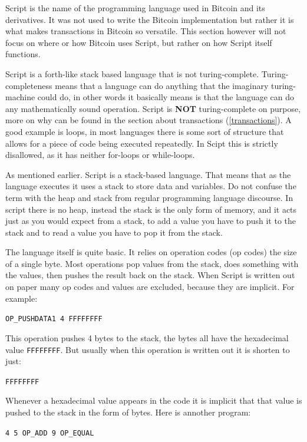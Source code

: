 
Script is the name of the programming language used in Bitcoin and its derivatives. It was not used to write the Bitcoin implementation but rather it is what makes transactions in Bitcoin so versatile. This section however will not focus on where or how Bitcoin uses Script, but rather on how Script itself functions.

Script is a forth-like stack based language that is not turing-complete. Turing-completeness means that a language can do anything that the imaginary turing-machine could do, in other words it basically means is that the language can do any mathematically sound operation. Script is \textbf{NOT} turing-complete on purpose, more on why can be found in the section about transactions (\ref{transactions}). A good example is loops, in most languages there is some sort of structure that allows for a piece of code being executed repeatedly. In Scipt this is strictly disallowed, as it has neither for-loops or while-loops. 

As mentioned earlier. Script is a stack-based language. That means that as the language executes it uses a stack to store data and variables. Do not confuse the term with the heap and stack from regular programming language discourse. In script there is no heap, instead the stack is the only form of memory, and it acts just as you would expect from a stack, to add a value you have to push it to the stack and to read a value you have to pop it from the stack.

The language itself is quite basic. It relies on operation codes (op codes) the size of a single byte. Most operations pop values from the stack, does something with the values, then pushes the result back on the stack. When Script is written out on paper many op codes and values are excluded, because they are implicit. For example: 

\texttt{OP\_PUSHDATA1 4 FFFFFFFF} 

This operation pushes 4 bytes to the stack, the bytes all have the hexadecimal value \texttt{FFFFFFFF}. But usually when this operation is written out it is shorten to just:

\texttt{FFFFFFFF} 

Whenever a hexadecimal value appears in the code it is implicit that that value is pushed to the stack in the form of bytes. Here is annother program:

\texttt{4 5 OP\_ADD 9 OP\_EQUAL}

